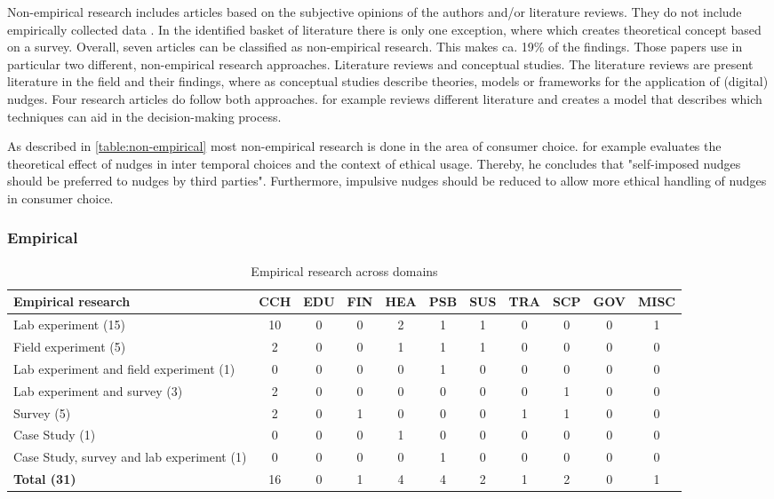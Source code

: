 Non-empirical research includes articles based on the subjective opinions of the authors and/or literature reviews. They do not include empirically collected data \cite{alavi_review_1992}. In the identified basket of literature there is only one exception, where \cite{gamliel_average_2017} which creates theoretical concept based on a survey. Overall, seven articles can be classified as non-empirical research. This makes ca. 19\% of the findings. Those papers use in particular two different, non-empirical research approaches. Literature reviews and conceptual studies. The literature reviews are present literature in the field and their findings, where as conceptual studies describe theories, models or frameworks for the application of (digital) nudges. Four research articles do follow both approaches. \cite{broniarczyk_decision_2014} for example reviews different literature and creates a model that describes which techniques can aid in the decision-making process.

As described in  \ref{table:non-empirical} most non-empirical research is done in the area of consumer choice. \cite{lades_impulsive_2014} for example evaluates the theoretical effect of nudges in inter temporal choices and the context of ethical usage. Thereby, he concludes that "self-imposed nudges should be preferred to nudges by third parties". Furthermore, impulsive nudges should be reduced to allow more ethical handling of nudges in consumer choice.


\subsubsection{Empirical}
\begin{table}[htbp]
\small
\centering
\begin{tabular}{p{3.6cm}|cccccccccc}
\textbf{Empirical research} & \textbf{CCH} & \textbf{EDU} & \textbf{FIN} & \textbf{HEA} & \textbf{PSB} & \textbf{SUS} & \textbf{TRA} & \textbf{SCP} & \textbf{GOV} & \textbf{MISC} \\ \hline
Lab experiment (15) & 10 & 0 & 0 & 2 & 1 & 1 & 0 & 0 & 0 & 1 \\
Field experiment (5) & 2 & 0 & 0 & 1 & 1 & 1 & 0 & 0 & 0 & 0 \\
Lab experiment and field experiment (1) & 0 & 0 & 0 & 0 & 1 & 0 & 0 & 0 & 0 & 0 \\
Lab experiment and survey (3) & 2 & 0 & 0 & 0 & 0 & 0 & 0 & 1 & 0 & 0 \\
Survey (5) & 2 & 0 & 1 & 0 & 0 & 0 & 1 & 1 & 0 & 0 \\
Case Study (1) & 0 & 0 & 0 & 1 & 0 & 0 & 0 & 0 & 0 & 0 \\
Case Study, survey and lab experiment (1) & 0 & 0 & 0 & 0 & 1 & 0 & 0 & 0 & 0 & 0 \\ \hline
\textbf{Total (31)} & 16 & 0 & 1 & 4 & 4 & 2 & 1 & 2 & 0 & 1
\end{tabular}
\caption{Empirical research across domains}
\label{table:empirical}
\end{table}


